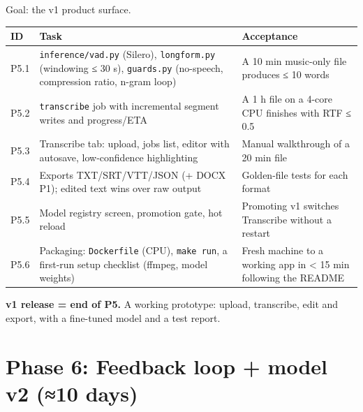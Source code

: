 \documentclass[11pt]{article}
\begin{document}
Goal: the v1 product surface.

\begin{longtable}[]{@{}>{\raggedright\arraybackslash}p{}>{\raggedright\arraybackslash}p{}>{\raggedright\arraybackslash}p{}@{}}
\toprule\noalign{}
ID & Task & Acceptance \\
\midrule\noalign{}
\endhead
\bottomrule\noalign{}
\endlastfoot
P5.1 & \texttt{inference/\allowbreak{}vad.\allowbreak{}py} (Silero), \texttt{longform.\allowbreak{}py} (windowing ≤ 30 s), \texttt{guards.\allowbreak{}py} (no-speech, compression ratio, n-gram loop) & A 10 min music-only file produces ≤ 10 words \\
P5.2 & \texttt{transcribe} job with incremental segment writes and progress/ETA & A 1 h file on a 4-core CPU finishes with RTF ≤ 0.5 \\
P5.3 & Transcribe tab: upload, jobs list, editor with autosave, low-confidence highlighting & Manual walkthrough of a 20 min file \\
P5.4 & Exports TXT/SRT/VTT/JSON (+ DOCX P1); edited text wins over raw output & Golden-file tests for each format \\
P5.5 & Model registry screen, promotion gate, hot reload & Promoting v1 switches Transcribe without a restart \\
P5.6 & Packaging: \texttt{Dockerfile} (CPU), \texttt{make run}, a first-run setup checklist (ffmpeg, model weights) & Fresh machine to a working app in \textless{} 15 min following the README \\
\end{longtable}

\textbf{v1 release = end of P5.} A working prototype: upload, transcribe, edit and export, with a fine-tuned model and a test report.

\hypertarget{phase-6-feedback-loop--model-v2-10-days}{%
\section{Phase 6: Feedback loop + model v2 (≈10 days)}\label{phase-6-feedback-loop--model-v2-10-days}}
\end{document}
